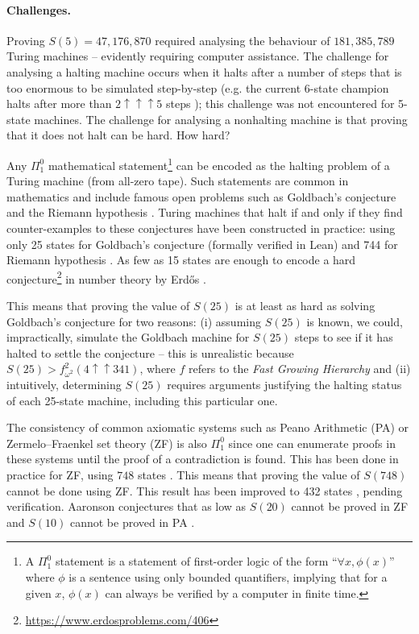 \documentclass[sigconf,screen]{acmart}
\theoremstyle{definition} %
\numberwithin{equation}{section}
\theoremstyle{definition} %
\newcommand{\BBtheFifth}{47{,}176{,}870}
\newcommand{\BBtheFifthTNF}{181{,}385{,}789}
\begin{document}
\vspace{-2ex}
\paragraph{Challenges.} Proving $S(5) = \BBtheFifth$ required analysing the behaviour of $\BBtheFifthTNF$ Turing machines -- evidently requiring computer assistance. The challenge for analysing a halting machine occurs when it halts after a number of steps that is too enormous to be simulated step-by-step (e.g. the current 6-state champion halts after more than $2 \uparrow \uparrow \uparrow 5$ steps \cite{BB5}); this challenge was not encountered for 5-state machines. The challenge for analysing a nonhalting machine is that proving that it does not halt can be hard. How hard?

Any $\Pi_1^0$ mathematical statement\footnote{A $\Pi_1^0$ statement is a statement of first-order logic of the form ``$\forall x, \phi(x)$'' where $\phi$ is a sentence using only bounded quantifiers, implying that for a given $x$, $\phi(x)$ can always be verified by a computer in finite time.} can be encoded as the halting problem of a Turing machine (from all-zero tape). Such statements are common in mathematics and include famous open problems such as Goldbach's conjecture and the Riemann hypothesis \cite{Davis-Matiyasevich-Robinson-1976}. Turing machines that halt if and only if they find counter-examples to these conjectures have been constructed in practice: using only 25 states for Goldbach's conjecture (formally verified in Lean) \cite{GoldbachTM27, GoldbachTM25, DeMouraKongAvigadVanDoornvonRaumer} and 744 for Riemann hypothesis \cite{RiemannTM,Yedidia2016,BusyBeaverFrontier}. As few as 15 states are enough to encode a hard conjecture\footnote{\url{https://www.erdosproblems.com/406}} in number theory by Erd\H{o}s \cite{BB15}.

This means that proving the value of $S(25)$ is at least as hard as solving Goldbach's conjecture for two reasons: (i) assuming $S(25)$ is known, we could, impractically, simulate the Goldbach machine for $S(25)$ steps to see if it has halted to settle the conjecture -- this is unrealistic because $S(25) > f^2_{\omega^2}(4 \uparrow \uparrow 341)$, where $f$ refers to the \textit{Fast Growing Hierarchy} \cite{wikiChampions,wainer1970classification} and (ii) intuitively, determining $S(25)$ requires arguments justifying the halting status of each 25-state machine, including this particular one.

The consistency of common axiomatic systems such as Peano Arithmetic (PA) or Zermelo–Fraenkel set theory (ZF) is also $\Pi_1^0$ since one can enumerate proofs in these systems until the proof of a contradiction is found. This has been done in practice for ZF, using $748$ states \cite{BB748Thesis,Yedidia2016,BusyBeaverFrontier}. This means that proving the value of $S(748)$ cannot be done using ZF. This result has been improved to 432 states \cite{RidenourZF636, wade2025alignment}, pending verification. Aaronson conjectures that as low as $S(20)$ cannot be proved in ZF and $S(10)$ cannot be proved in PA \cite{BusyBeaverFrontier}.
\end{document}
